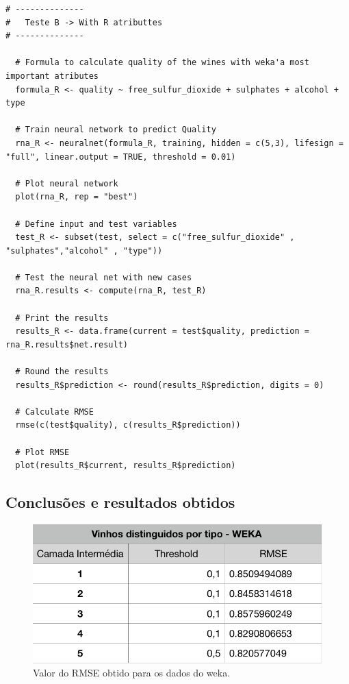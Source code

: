 \documentclass{report}
\begin{document}
\begin{verbatim}
# --------------
#	Teste B	-> With R atributtes
# --------------

  # Formula to calculate quality of the wines with weka'a most important atributes
  formula_R <- quality ~ free_sulfur_dioxide + sulphates + alcohol + type
  
  # Train neural network to predict Quality
  rna_R <- neuralnet(formula_R, training, hidden = c(5,3), lifesign = "full", linear.output = TRUE, threshold = 0.01)
  
  # Plot neural network
  plot(rna_R, rep = "best")
  
  # Define input and test variables
  test_R <- subset(test, select = c("free_sulfur_dioxide" , "sulphates","alcohol" , "type"))
  
  # Test the neural net with new cases
  rna_R.results <- compute(rna_R, test_R)
  
  # Print the results
  results_R <- data.frame(current = test$quality, prediction = rna_R.results$net.result)
  
  # Round the results
  results_R$prediction <- round(results_R$prediction, digits = 0)
  
  # Calculate RMSE
  rmse(c(test$quality), c(results_R$prediction))
  
  # Plot RMSE
  plot(results_R$current, results_R$prediction)

\end{verbatim}
\bigskip


\subsection{Conclusões e resultados obtidos}

\begin{figure}[H]
\centering
\includegraphics[scale=0.5]{tabelas/5} 
\caption{Valor do RMSE obtido para os dados do weka.}
\end{figure}
\end{document}
